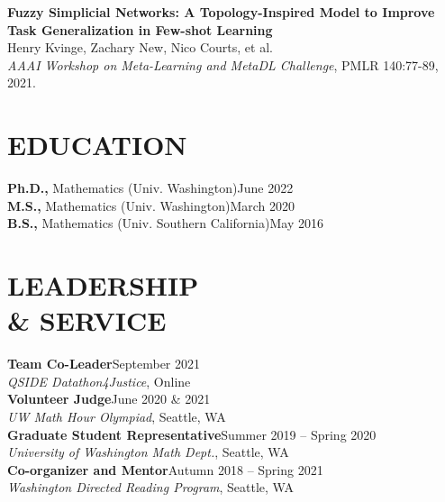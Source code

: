 \documentclass[margin]{res} %
\begin{document}
\begin{resume}
\textbf{Fuzzy Simplicial Networks: A Topology-Inspired Model to Improve Task Generalization in Few-shot Learning}\\
Henry Kvinge, Zachary New, Nico Courts, et al.\\
\textit{AAAI Workshop on Meta-Learning and MetaDL Challenge}, PMLR 140:77-89, 2021.


\section{EDUCATION}

{\bf Ph.D.,} Mathematics (Univ. Washington)\hfill June 2022 \\
{\bf M.S.,} Mathematics (Univ. Washington)\hfill March 2020 \\
{\bf B.S.,} Mathematics (Univ. Southern California)\hfill May 2016 


\section{LEADERSHIP \\\& SERVICE}
{\bf Team Co-Leader}\hfill September 2021\\\smallskip
{\sl QSIDE Datathon4Justice}, Online \\
{\bf Volunteer Judge}\hfill June 2020 \& 2021\\\smallskip
{\sl UW Math Hour Olympiad}, Seattle, WA\\
{\bf Graduate Student Representative}\hfill Summer 2019 -- Spring 2020\\\smallskip
{\sl University of Washington Math Dept.}, Seattle, WA\\
{\bf Co-organizer and Mentor}\hfill Autumn 2018 -- Spring 2021\\
{\sl Washington Directed Reading Program}, Seattle, WA

\end{resume}
\end{document}
